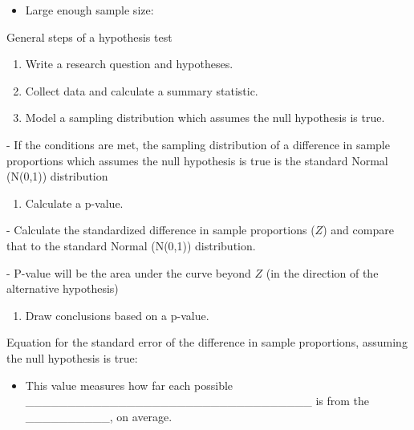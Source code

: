 \documentclass[
]{report}
\providecommand{\tightlist}{%
  \setlength{\itemsep}{0pt}\setlength{\parskip}{0pt}}
\newcommand{\rgi}{\hspace{24pt}}  %
\begin{document}
\vspace{0.2in}

\begin{itemize}
\tightlist
\item
  Large enough sample size:
\end{itemize}

\vspace{0.7in}

General steps of a hypothesis test

\begin{enumerate}
\def\labelenumi{\arabic{enumi}.}
\item
  Write a research question and hypotheses.
\item
  Collect data and calculate a summary statistic.
\item
  Model a sampling distribution which assumes the null hypothesis is true.
\end{enumerate}

\rgi \rgi - If the conditions are met, the sampling distribution of a difference in sample proportions which assumes the null hypothesis is true is the standard Normal (N(0,1)) distribution

\begin{enumerate}
\def\labelenumi{\arabic{enumi}.}
\setcounter{enumi}{3}
\tightlist
\item
  Calculate a p-value.
\end{enumerate}

\rgi \rgi - Calculate the standardized difference in sample proportions (\(Z\)) and compare that to the standard Normal (N(0,1)) distribution.

\rgi \rgi - P-value will be the area under the curve beyond \(Z\) (in the direction of the alternative hypothesis)

\begin{enumerate}
\def\labelenumi{\arabic{enumi}.}
\setcounter{enumi}{4}
\tightlist
\item
  Draw conclusions based on a p-value.
\end{enumerate}

Equation for the standard error of the difference in sample proportions, assuming the null hypothesis is true:

\vspace{0.8in}


\begin{itemize}
\tightlist
\item
  This value measures how far each possible \_\_\_\_\_\_\_\_\_\_\_\_\_\_\_\_\_\_\_\_\_\_\_\_\_\_\_\_\_\_\_\_\_\_ is from the \_\_\_\_\_\_\_\_\_\_, on average.
\end{itemize}
\end{document}

